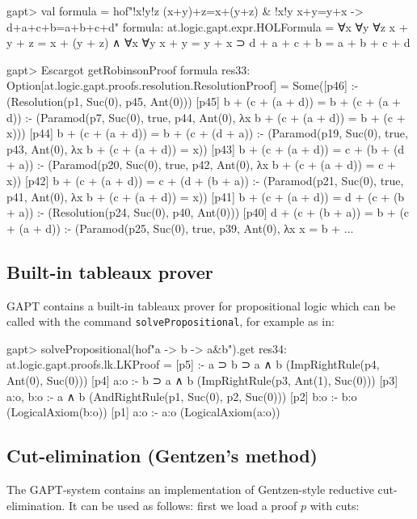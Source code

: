 \documentclass[a4paper,11pt]{article}
\begin{document}
\begin{clilisting}
gapt> val formula = hof"!x!y!z (x+y)+z=x+(y+z) & !x!y x+y=y+x -> d+a+c+b=a+b+c+d"
formula: at.logic.gapt.expr.HOLFormula =
∀x ∀y ∀z x + y + z = x + (y + z) ∧ ∀x ∀y x + y = y + x ⊃
  d + a + c + b = a + b + c + d

gapt> Escargot getRobinsonProof formula
res33: Option[at.logic.gapt.proofs.resolution.ResolutionProof] =
Some([p46]  :-    (Resolution(p1, Suc(0), p45, Ant(0)))
[p45] b + (c + (a + d)) = b + (c + (a + d)) :-    (Paramod(p7, Suc(0), true, p44, Ant(0), λx b + (c + (a + d)) = b + (c + x)))
[p44] b + (c + (a + d)) = b + (c + (d + a)) :-    (Paramod(p19, Suc(0), true, p43, Ant(0), λx b + (c + (a + d)) = x))
[p43] b + (c + (a + d)) = c + (b + (d + a)) :-    (Paramod(p20, Suc(0), true, p42, Ant(0), λx b + (c + (a + d)) = c + x))
[p42] b + (c + (a + d)) = c + (d + (b + a)) :-    (Paramod(p21, Suc(0), true, p41, Ant(0), λx b + (c + (a + d)) = x))
[p41] b + (c + (a + d)) = d + (c + (b + a)) :-    (Resolution(p24, Suc(0), p40, Ant(0)))
[p40] d + (c + (b + a)) = b + (c + (a + d)) :-    (Paramod(p25, Suc(0), true, p39, Ant(0), λx x = b + ...
\end{clilisting}

\subsection{Built-in tableaux prover}

GAPT contains a  built-in tableaux prover for propositional logic
which can be called with the command \texttt{solvePropositional}, for example as in:
\begin{clilisting}
gapt> solvePropositional(hof"a -> b -> a&b").get
res34: at.logic.gapt.proofs.lk.LKProof =
[p5]  :- a ⊃ b ⊃ a ∧ b    (ImpRightRule(p4, Ant(0), Suc(0)))
[p4] a:o :- b ⊃ a ∧ b    (ImpRightRule(p3, Ant(1), Suc(0)))
[p3] a:o, b:o :- a ∧ b    (AndRightRule(p1, Suc(0), p2, Suc(0)))
[p2] b:o :- b:o    (LogicalAxiom(b:o))
[p1] a:o :- a:o    (LogicalAxiom(a:o))

\end{clilisting}


\subsection{Cut-elimination (Gentzen's method)}

The GAPT-system contains an implementation of Gentzen-style reductive
cut-elimination.  It can be used as follows: first we load a proof $p$ with
cuts:
\end{document}
